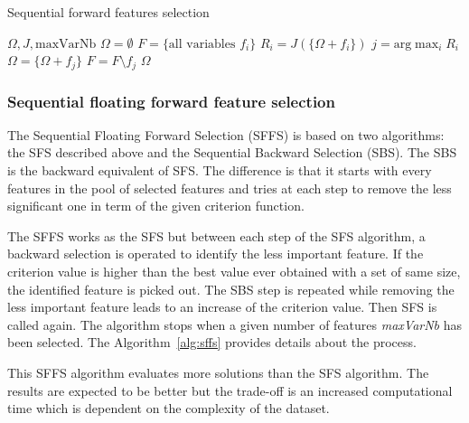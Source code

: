 \documentclass[journal,peerreview,onecolumn]{IEEEtran}
\begin{document}
        \begin{algorithm}
        \caption{Sequential forward features selection\label{alg:sfs}}
        {\footnotesize
        \begin{algorithmic}[1]
        \REQUIRE $\Omega,J,\text{maxVarNb}$
        \STATE $\Omega=\emptyset$
        \STATE $F=\text{\{all variables $f_i$\}}$
        \STATE $R_i = J(\{\Omega + f_i\})$
        \ENDFOR
        \STATE $j=\text{arg} \max_{i} R_i$
        \STATE $\Omega = \{\Omega + f_j\}$
        \STATE $F = F \setminus f_j$
        \ENDWHILE
        \RETURN $\Omega$
        \end{algorithmic}
        }
        \end{algorithm}

        \subsubsection{Sequential floating forward feature selection}
        \label{sec:floating-presentation}

        The Sequential Floating Forward Selection (SFFS)\cite{somol1999adaptive} is based on two algorithms: the SFS described above and the Sequential Backward Selection (SBS). The SBS is the backward equivalent of SFS. The difference is that it starts with every features in the pool of selected features and tries at each step to remove the less significant one in term of the given criterion function.

        The SFFS works as the SFS but between each step of the SFS algorithm, a backward selection is operated to identify the less important feature. If the criterion value is higher than the best value ever obtained with a set of same size, the identified feature is picked out. The SBS step is repeated while removing the less important feature leads to an increase of the criterion value. Then SFS is called again. The algorithm stops when a given number of features \emph{maxVarNb} has been selected. The Algorithm~\ref{alg:sffs} provides details about the process.

        This SFFS algorithm evaluates more solutions than the SFS algorithm. The results are expected to be better but the trade-off is an increased computational time which is dependent on the complexity of the dataset.
\end{document}
